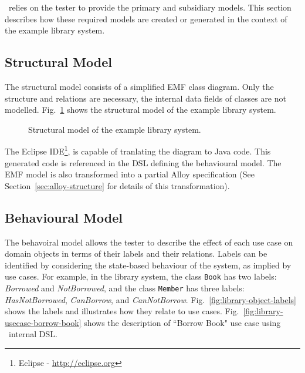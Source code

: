 %
%
\label{sec:create-test-model}
\this~relies on the tester to provide the primary and subsidiary models. This section describes how these required models are created or generated in the context of the example library system. 

\subsection{Structural Model}
\label{sec:create-test model-structure}
The structural model consists of a simplified EMF class diagram. Only the structure and relations are necessary, the internal data fields of classes are not modelled. Fig.~\ref{fig:library-structure-model} shows the structural model of the example library system.

\begin{figure}[h]
\centering
{}
\hfil
{}
\caption{Structural model of the example library system.}
\label{fig:library-structure-model}
\end{figure} 

The Eclipse IDE\footnote{Eclipse - \url{http://eclipse.org}}, is capable of tranlating the diagram to Java code. This generated code is referenced in the DSL defining the behavioural model. The EMF model is also transformed into a partial Alloy specification (See  Section~\ref{sec:alloy-structure} for details of this transformation).

\subsection{Behavioural Model}
\label{sec:create-test model-behaviour}

The behavoiral model allows the tester to describe the effect of each use case on domain objects in terms of their labels and their relations. Labels can be identified by considering the state-based behaviour of the system, as implied by use cases. For example, in the library system, the class \texttt{Book} has two labels: \textit{Borrowed} and \textit{NotBorrowed}, and the class \texttt{Member} has three labels: \textit{HasNotBorrowed}, \textit{CanBorrow}, and \textit{CanNotBorrow}. Fig.~\ref{fig:library-object-labels} shows the labels and illustrates how they relate to use cases. Fig.~\ref{fig:library-usecase-borrow-book} shows the description of ``Borrow Book" use case using \this~internal  DSL. 

